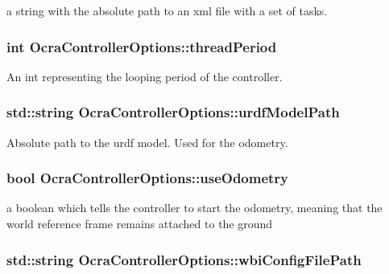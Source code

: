 a string with the absolute path to an xml file with a set of tasks. \hypertarget{classOcraControllerOptions_ab706ae593bf5b30433cfd6f957b51db4}{
\subsubsection[{thread\-Period}]{\setlength{\rightskip}{0pt plus 5cm}int {\bf \-Ocra\-Controller\-Options\-::thread\-Period}}}\label{classOcraControllerOptions_ab706ae593bf5b30433cfd6f957b51db4}
\-An int representing the looping period of the controller. \hypertarget{classOcraControllerOptions_a697196e6267b2a519dd0bcc2bc03ab73}{
\subsubsection[{urdf\-Model\-Path}]{\setlength{\rightskip}{0pt plus 5cm}std\-::string {\bf \-Ocra\-Controller\-Options\-::urdf\-Model\-Path}}}\label{classOcraControllerOptions_a697196e6267b2a519dd0bcc2bc03ab73}
\-Absolute path to the urdf model. \-Used for the odometry. \hypertarget{classOcraControllerOptions_a335f09b446b6d10e2a8e6eb453391d9e}{
\subsubsection[{use\-Odometry}]{\setlength{\rightskip}{0pt plus 5cm}bool {\bf \-Ocra\-Controller\-Options\-::use\-Odometry}}}\label{classOcraControllerOptions_a335f09b446b6d10e2a8e6eb453391d9e}
a boolean which tells the controller to start the odometry, meaning that the world reference frame remains attached to the ground \hypertarget{classOcraControllerOptions_af3a98210531cf667c2838e45b470a66e}{
\subsubsection[{wbi\-Config\-File\-Path}]{\setlength{\rightskip}{0pt plus 5cm}std\-::string {\bf \-Ocra\-Controller\-Options\-::wbi\-Config\-File\-Path}}}\label{classOcraControllerOptions_af3a98210531cf667c2838e45b470a66e}
